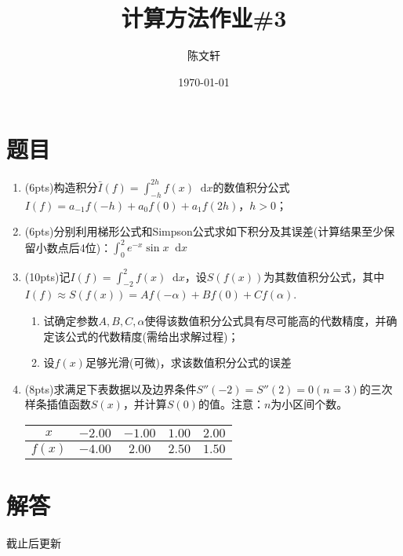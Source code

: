 \documentclass[cn,hazy,green,11pt,normal]{elegantnote}
\title{计算方法作业\#3}
\author{陈文轩}
\institute{KFRC}
\date{\today}
\newcommand*{\diff}{\mathop{}\!\mathrm{d}}
\begin{document}
\maketitle


\section{题目}

    \begin{enumerate}
        \item (6pts)构造积分$\bar{I}(f)=\int_{-h}^{2h}f(x)\diff x$的数值积分公式$I(f)=a_{-1}f(-h)+a_0 f(0)+a_1 f(2h)$，$h>0$；
        \item (6pts)分别利用梯形公式和Simpson公式求如下积分及其误差(计算结果至少保留小数点后4位)：$\int_0^2 e^{-x}\sin x\diff x$
        \item (10pts)记$I(f)=\int_{-2}^2 f(x)\diff x$，设$S(f(x))$为其数值积分公式，其中$I(f)\approx S(f(x))=Af(-\alpha)+Bf(0)+Cf(\alpha)$.
            \begin{enumerate}
                \item 试确定参数$A,B,C,\alpha$使得该数值积分公式具有尽可能高的代数精度，并确定该公式的代数精度(需给出求解过程)；
                \item 设$f(x)$足够光滑(可微)，求该数值积分公式的误差
            \end{enumerate}
        \item (8pts)求满足下表数据以及边界条件$S''(-2)=S''(2)=0(n=3)$的三次样条插值函数$S(x)$，并计算$S(0)$的值。注意：$n$为小区间个数。
            \begin{table}[htb]
                \begin{center}
                    \begin{tabular}{|c|c|c|c|c|}
                    \hline
                    $x$ & $-2.00$ & $-1.00$ & $1.00$ & $2.00$ \\
                    \hline
                    $f(x)$ & $-4.00$ & $2.00$ & $2.50$ & $1.50$ \\
                    \hline
                    \end{tabular}
                \end{center}
            \end{table}
    \end{enumerate}

\section{解答}

    截止后更新
\end{document}

